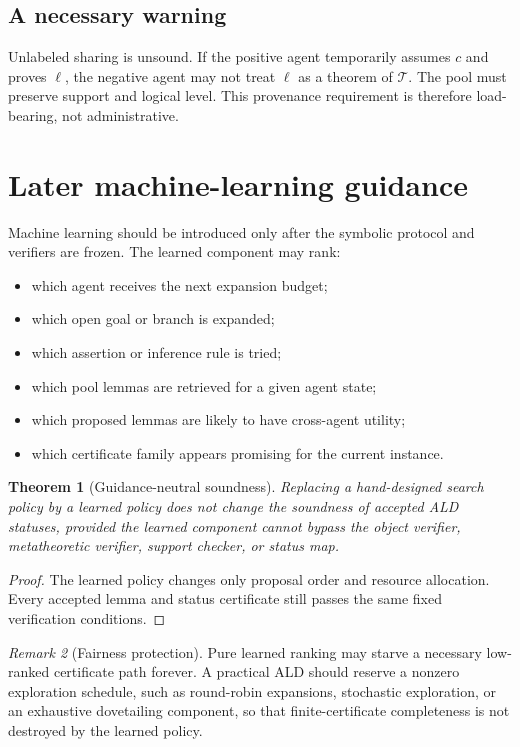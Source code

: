 \documentclass[11pt]{article}
\newtheorem{theorem}{Theorem}[section]
\theoremstyle{definition}
\theoremstyle{remark}
\newtheorem{remark}[theorem]{Remark}
\newcommand{\T}{\mathcal T}
\begin{document}
\subsection{A necessary warning}
Unlabeled sharing is unsound. If the positive agent temporarily assumes $c$ and proves $\ell$, the negative agent may not treat $\ell$ as a theorem of $\T$. The pool must preserve support and logical level. This provenance requirement is therefore load-bearing, not administrative.

\section{Later machine-learning guidance}

Machine learning should be introduced only after the symbolic protocol and verifiers are frozen. The learned component may rank:
\begin{itemize}
  \item which agent receives the next expansion budget;
  \item which open goal or branch is expanded;
  \item which assertion or inference rule is tried;
  \item which pool lemmas are retrieved for a given agent state;
  \item which proposed lemmas are likely to have cross-agent utility;
  \item which certificate family appears promising for the current instance.
\end{itemize}

\begin{theorem}[Guidance-neutral soundness]
Replacing a hand-designed search policy by a learned policy does not change the soundness of accepted ALD statuses, provided the learned component cannot bypass the object verifier, metatheoretic verifier, support checker, or status map.
\end{theorem}
\begin{proof}
The learned policy changes only proposal order and resource allocation. Every accepted lemma and status certificate still passes the same fixed verification conditions.
\end{proof}

\begin{remark}[Fairness protection]
Pure learned ranking may starve a necessary low-ranked certificate path forever. A practical ALD should reserve a nonzero exploration schedule, such as round-robin expansions, stochastic exploration, or an exhaustive dovetailing component, so that finite-certificate completeness is not destroyed by the learned policy.
\end{remark}
\end{document}
